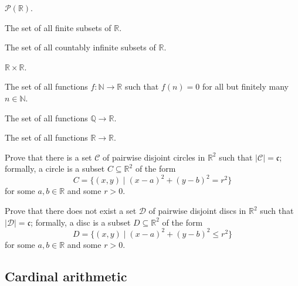 \begin{chapex}
\label{cqFindCardinalityBegin}
$\mathcal{P}(\mathbb{R})$.
\end{chapex}

\begin{chapex}
The set of all finite subsets of $\mathbb{R}$.
\end{chapex}

\begin{chapex}
The set of all countably infinite subsets of $\mathbb{R}$.
\end{chapex}

\begin{chapex}
$\mathbb{R} \times \mathbb{R}$.
\end{chapex}

\begin{chapex}
The set of all functions $f : \mathbb{N} \to \mathbb{R}$ such that $f(n) = 0$ for all but finitely many $n \in \mathbb{N}$.
\end{chapex}

\begin{chapex}
The set of all functions $\mathbb{Q} \to \mathbb{R}$.
\end{chapex}

\begin{chapex}
\label{cqFindCardinalityEnd}
The set of all functions $\mathbb{R} \to \mathbb{R}$.
\end{chapex}

\begin{chapex}
Prove that there is a set $\mathcal{C}$ of pairwise disjoint circles in $\mathbb{R}^2$ such that $|\mathcal{C}| = \mathfrak{c}$; formally, a circle is a subset $C \subseteq \mathbb{R}^2$ of the form
\[ C = \{ (x,y) \mid (x-a)^2 + (y-b)^2 = r^2 \} \]
for some $a,b \in \mathbb{R}$ and some $r > 0$.
\end{chapex}

\begin{chapex}
Prove that there does not exist a set $\mathcal{D}$ of pairwise disjoint discs in $\mathbb{R}^2$ such that $|\mathcal{D}| = \mathfrak{c}$; formally, a disc is a subset $D \subseteq \mathbb{R}^2$ of the form
\[ D = \{ (x,y) \mid (x-a)^2 + (y-b)^2 \le r^2 \} \]
for some $a,b \in \mathbb{R}$ and some $r>0$.
\end{chapex}

\subsection*{Cardinal arithmetic}

